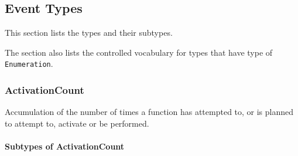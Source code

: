 \subsection{Event Types} \label{sec:Event Types}


This section lists the  types and their subtypes. 

The section also lists the \gls{controlled vocabulary} for types that have  type of \texttt{Enumeration}.


\subsubsection{ActivationCount}
\label{sec:ActivationCount}



Accumulation of the number of times a function has attempted to, or is planned to attempt to, activate or be performed.


\paragraph{Subtypes of ActivationCount}\mbox{}
\label{sec:Subtypes of ActivationCount}

